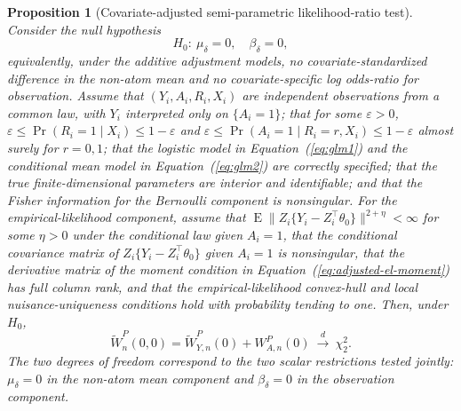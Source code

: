 \documentclass[11pt]{article}
\DeclareMathOperator*{\E}{E}
\newtheorem{proposition}{Proposition}
\begin{document}
\begin{proposition}[Covariate-adjusted semi-parametric likelihood-ratio test]\label{prop:covariate-adjusted-splrt}
Consider the null hypothesis
\[
  H_0:\ \mu_\delta = 0,\quad \beta_\delta = 0,
\]
equivalently, under the additive adjustment models, no covariate-standardized difference in the non-atom mean and no covariate-specific log odds-ratio for observation. Assume that $(Y_i,A_i,R_i,X_i)$ are independent observations from a common law, with $Y_i$ interpreted only on $\{A_i=1\}$; that for some $\varepsilon>0$, $\varepsilon \leq \Pr(R_i=1\mid X_i) \leq 1-\varepsilon$ and $\varepsilon \leq \Pr(A_i=1\mid R_i=r,X_i) \leq 1-\varepsilon$ almost surely for $r=0,1$; that the logistic model in Equation~(\ref{eq:glm1}) and the conditional mean model in Equation~(\ref{eq:glm2}) are correctly specified; that the true finite-dimensional parameters are interior and identifiable; and that the Fisher information for the Bernoulli component is nonsingular. For the empirical-likelihood component, assume that $\E\|Z_i\{Y_i-Z_i^\top\theta_0\}\|^{2+\eta}<\infty$ for some $\eta>0$ under the conditional law given $A_i=1$, that the conditional covariance matrix of $Z_i\{Y_i-Z_i^\top\theta_0\}$ given $A_i=1$ is nonsingular, that the derivative matrix of the moment condition in Equation~(\ref{eq:adjusted-el-moment}) has full column rank, and that the empirical-likelihood convex-hull and local nuisance-uniqueness conditions hold with probability tending to one. Then, under $H_0$,
\[
  \widetilde{W}_n^P(0,0)
  =
  \widetilde{W}_{Y,n}^P(0)+W_{A,n}^P(0)
  \ \overset{d}{\longrightarrow}\ \chi^2_2.
\]
The two degrees of freedom correspond to the two scalar restrictions tested jointly: $\mu_\delta=0$ in the non-atom mean component and $\beta_\delta=0$ in the observation component.
\end{proposition}
\end{document}
